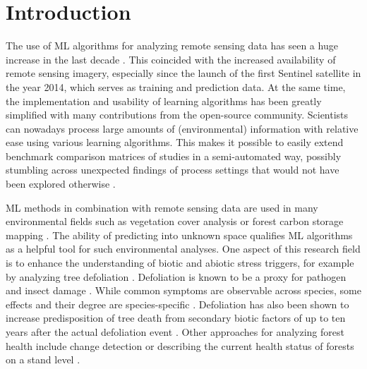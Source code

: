 \documentclass[remotesensing,article,submit,moreauthors,pdftex]{Definitions/mdpi}
\begin{document}
\section{Introduction}

The use of \ac{ML} algorithms for analyzing remote sensing data has seen a huge increase in the last decade \cite{lary2016}.
This coincided with the increased availability of remote sensing imagery, especially since the launch of the first Sentinel satellite in the year 2014, which serves as training and prediction data.
At the same time, the implementation and usability of learning algorithms has been greatly simplified with many contributions from the open-source community.
Scientists can nowadays process large amounts of (environmental) information with relative ease using various learning algorithms.
This makes it possible to easily extend benchmark comparison matrices of studies in a semi-automated way, possibly stumbling across unexpected findings of process settings that would not have been explored otherwise \cite{ma2015}.


ML methods in combination with remote sensing data are used in many environmental fields such as vegetation cover analysis or forest carbon storage mapping \cite{mascaro2014, urban2018}.
The ability of predicting into unknown space qualifies ML algorithms as a helpful tool for such environmental analyses.
One aspect of this research field is to enhance the understanding of biotic and abiotic stress triggers, for example by analyzing tree defoliation \cite{hawrylo2018}.
Defoliation is known to be a proxy for pathogen and insect damage \cite{pollastrini2016}.
While common symptoms are observable across species, some effects and their degree are species-specific \cite{gottardini2020}.
Defoliation has also been shown to increase predisposition of tree death from secondary biotic factors of up to ten years after the actual defoliation event \cite{oliva2016}.
Other approaches for analyzing forest health include change detection \cite{zhang2016} or describing the current health status of forests on a stand level \cite{townsend2012}.
\end{document}
